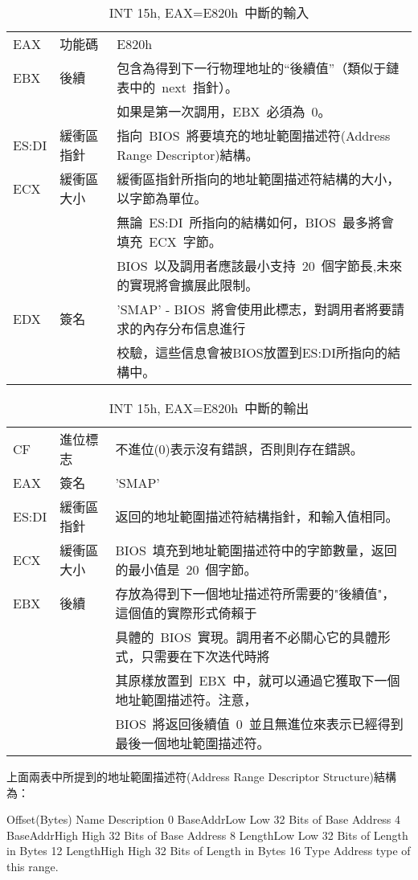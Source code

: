 \begin{center}\begin{longtable}{lll}
\caption[]{INT 15h, EAX=E820h~中斷的輸入}\label{e820_input}\\
\hline
EAX & 功能碼 & E820h\\
EBX & 後續   & 包含為得到下一行物理地址的“後續值”（類似于鏈表中的~next~指針）。\\
& & 如果是第一次調用，EBX~必須為~0。\\
ES:DI & 緩衝區指針 & 指向~BIOS~將要填充的地址範圍描述符(Address Range Descriptor)結構。\\
ECX & 緩衝區大小 & 緩衝區指針所指向的地址範圍描述符結構的大小，以字節為單位。\\
& & 無論~ES:DI~所指向的結構如何，BIOS~最多將會填充~ECX~字節。\\
& & BIOS~以及調用者應該最小支持~20~個字節長,未來的實現將會擴展此限制。\\
EDX & 簽名 & 'SMAP' - BIOS~將會使用此標志，對調用者將要請求的內存分布信息進行\\
& & 校驗，這些信息會被BIOS放置到ES:DI所指向的結構中。\\
\hline
\end{longtable}\end{center}

\begin{center}\begin{longtable}{lll}
\caption[]{INT 15h, EAX=E820h~中斷的輸出}\label{e820_output}\\
\hline
CF & 進位標志 & 不進位(0)表示沒有錯誤，否則則存在錯誤。\\
EAX & 簽名   & 'SMAP'\\
ES:DI & 緩衝區指針 & 返回的地址範圍描述符結構指針，和輸入值相同。\\
ECX & 緩衝區大小 & BIOS~填充到地址範圍描述符中的字節數量，返回的最小值是~20~個字節。\\
EBX & 後續 & 存放為得到下一個地址描述符所需要的"後續值"，這個值的實際形式倚賴于\\
& & 具體的~BIOS~實現。調用者不必關心它的具體形式，只需要在下次迭代時將\\
& & 其原樣放置到~EBX~中，就可以通過它獲取下一個地址範圍描述符。注意，\\
& & BIOS~將返回後續值~0~並且無進位來表示已經得到最後一個地址範圍描述符。\\
\hline
\end{longtable}\end{center}

上面兩表中所提到的地址範圍描述符(Address Range Descriptor Structure)結構為：
\begin{Command}
Offset(Bytes)     Name        Description
      0       BaseAddrLow     Low 32 Bits of Base Address
      4       BaseAddrHigh    High 32 Bits of Base Address
      8       LengthLow       Low 32 Bits of Length in Bytes
     12       LengthHigh      High 32 Bits of Length in Bytes
     16       Type            Address type of  this range.
\end{Command}

